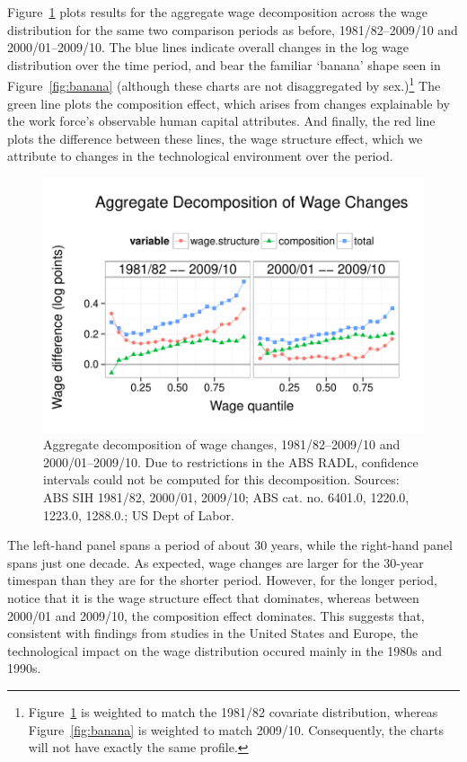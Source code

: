 Figure~\ref{fig:aggregate} plots results for the aggregate wage decomposition across the wage distribution for the same two comparison periods as before, 1981/82--2009/10 and 2000/01--2009/10. The blue lines indicate overall changes in the log wage distribution over the time period, and bear the familiar `banana' shape seen in Figure~\ref{fig:banana} (although these charts are not disaggregated by sex.)\footnote{Figure~\ref{fig:aggregate} is weighted to match the 1981/82 covariate distribution, whereas Figure~\ref{fig:banana} is weighted to match  2009/10. Consequently, the charts will not have exactly the same profile.} The green line plots the composition effect, which arises from changes explainable by the work force's observable human capital attributes. And finally, the red line plots the difference between these lines, the wage structure effect, which we attribute to changes in the technological environment over the period.

\begin{figure}[th]
  \centering
  \includegraphics[width=\textwidth]{../figure/aggregate_decomp.pdf}
  \caption{Aggregate decomposition of wage changes, 1981/82--2009/10 and 2000/01--2009/10. Due to restrictions in the ABS RADL, confidence intervals could not be computed for this decomposition. Sources: ABS SIH 1981/82, 2000/01, 2009/10; ABS cat. no. 6401.0, 1220.0, 1223.0, 1288.0.; US Dept of Labor.}
  \label{fig:aggregate}
\end{figure}

The left-hand panel spans a period of about 30 years, while the right-hand panel spans just one decade. As expected, wage changes are larger for the 30-year timespan than they are for the shorter period. However, for the longer period, notice that it is the wage structure effect that dominates, whereas between 2000/01 and 2009/10, the composition effect dominates. This suggests that, consistent with findings from studies in the United States and Europe, the technological impact on the wage distribution occured mainly in the 1980s and 1990s.


